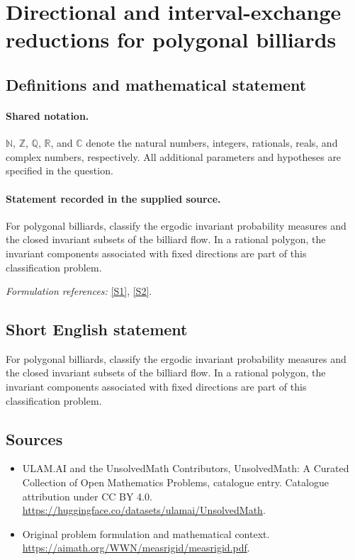\documentclass[11pt]{article}
\newcommand{\sref}[2]{\hyperlink{source:#1:#2}{[S#2]}}
\begin{document}
\section{Directional and interval-exchange reductions for polygonal billiards}\label{statement}

\subsection{Definitions and mathematical statement}

\paragraph{Shared notation.}$\mathbb N$, $\mathbb Z$, $\mathbb Q$, $\mathbb R$, and $\mathbb C$ denote the natural numbers, integers, rationals, reals, and complex numbers, respectively. All additional parameters and hypotheses are specified in the question.


\paragraph{Statement recorded in the supplied source.}
For polygonal billiards, classify the ergodic invariant probability measures and the closed invariant subsets of the billiard flow. In a rational polygon, the invariant components associated with fixed directions are part of this classification problem.
\par\smallskip\textit{Formulation references:} \sref{statement}{1}, \sref{statement}{2}.
\subsection{Short English statement}
For polygonal billiards, classify the ergodic invariant probability measures and the closed invariant subsets of the billiard flow. In a rational polygon, the invariant components associated with fixed directions are part of this classification problem.
\subsection{Sources}
\begin{itemize}
\item[\hypertarget{source:statement:1}{S1}] ULAM.AI and the UnsolvedMath Contributors, UnsolvedMath: A Curated Collection of Open Mathematics Problems, catalogue entry. Catalogue attribution under CC BY 4.0.
\url{https://huggingface.co/datasets/ulamai/UnsolvedMath}.
\item[\hypertarget{source:statement:2}{S2}] Original problem formulation and mathematical context.
\url{https://aimath.org/WWN/measrigid/measrigid.pdf}.
\end{itemize}
\label{end:statement}
\end{document}
